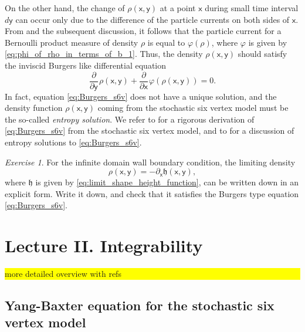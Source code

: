 \documentclass[letterpaper,11pt,oneside,reqno]{article}
\numberwithin{equation}{section}
\newcommand{\ssp}{\hspace{1pt}}
\theoremstyle{definition}
\theoremstyle{remark}
\newtheorem{exercise}{Exercise}[section]
\begin{document}
On the other hand, the change of
$\rho(\mathsf{x},\mathsf{y})$
at a point $\mathsf{x}$ during small time interval 
$d\mathsf{y}$ can occur only due to the difference of the particle currents
on both sides of $\mathsf{x}$. From 
and the subsequent discussion, it follows that the 
particle current for a Bernoulli product measure of density $\rho$ is equal to $\varphi(\rho)$,
where $\varphi$ is given by \eqref{eq:phi_of_rho_in_terms_of_b_1}.
Thus, the density $\rho(\mathsf{x},\mathsf{y})$ should satisfy the
inviscid Burgers like
differential equation
\begin{equation}
	\label{eq:Burgers_s6v}
	\frac{\partial}{\partial\mathsf{y}}\ssp 
	\rho(\mathsf{x},\mathsf{y})+
	\frac{\partial}{\partial\mathsf{x}}\ssp
	\varphi\left( \rho(\mathsf{x},\mathsf{y}) \right) =0.
\end{equation}
In fact, equation \eqref{eq:Burgers_s6v}
does not have a unique solution, and the density function $\rho(\mathsf{x},\mathsf{y})$
coming from the stochastic six vertex model must be the so-called \emph{entropy solution}.
We refer to 
\cite[Theorem 1.1]{aggarwal2020limit}
for a rigorous derivation of \eqref{eq:Burgers_s6v} from the stochastic six vertex model,
and to 
\cite[Section 2.3]{serre1999systems} for a discussion of entropy solutions to \eqref{eq:Burgers_s6v}.

\begin{exercise}
	For the infinite domain wall boundary condition,
	the limiting 
	density
	\begin{equation*}
		\rho(\mathsf{x},\mathsf{y})=-\partial_\mathsf{x} \mathfrak{h}(\mathsf{x},\mathsf{y}),
	\end{equation*}
	where $\mathfrak{h}$ is 
	given by \eqref{eq:limit_shape_height_function},
	can be written down in an explicit form.
	Write it down, and check that it satisfies the Burgers type equation \eqref{eq:Burgers_s6v}.
\end{exercise}

\newpage
\section{Lecture II. Integrability}
\label{sec:integrability}

\colorbox{yellow}{\parbox{.7\textwidth}{more detailed overview with refs}}

\subsection{Yang-Baxter equation for the stochastic six vertex model}
\label{sub:YBE}
\end{document}
